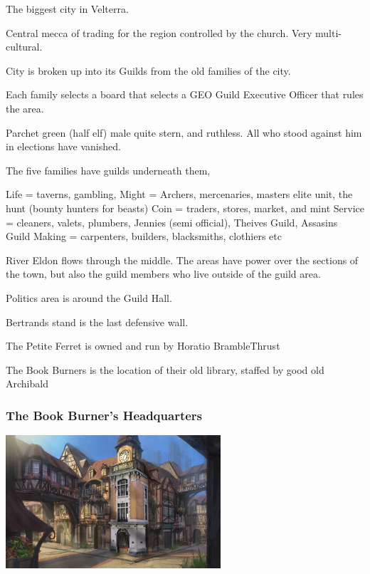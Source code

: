\noindent 

The biggest city in Velterra.

Central mecca of trading for the region controlled by the church. Very multi-cultural.

City is broken up into its Guilds from the old families of the city.

Each family selects a board that selects a GEO Guild Executive Officer that rules the area.

Parchet green (half elf) male quite stern, and ruthless. All who stood against him in elections have vanished.

The five families have guilds underneath them,

    Life = taverns, gambling,
    Might = Archers, mercenaries, masters elite unit, the hunt (bounty hunters for beasts)
    Coin = traders, stores, market, and mint
    Service = cleaners, valets, plumbers, Jennies (semi official), Theives Guild, Assasins Guild
    Making = carpenters, builders, blacksmiths, clothiers etc

River Eldon flows through the middle. The areas have power over the sections of the town, but also the guild members who live outside of the guild area.

Politics area is around the Guild Hall.

Bertrands stand is the last defensive wall.

The Petite Ferret is owned and run by Horatio BrambleThrust

The Book Burners is the location of their old library, staffed by good old Archibald

\smallskip

\subsubsection*{The Book Burner's Headquarters} 

\vspace{5mm}

\begin{center}
\includegraphics[width=80mm]{./content/img/bookBurnerBase.png}
\begin{figure}[h]
\end{figure}
\end{center}

